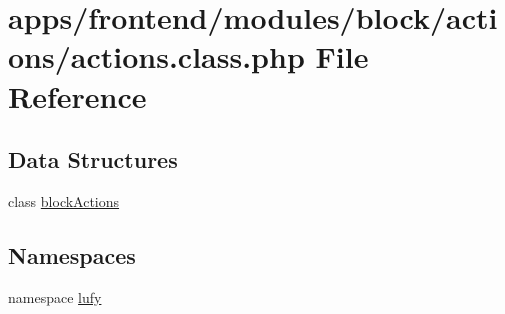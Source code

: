 \hypertarget{frontend_2modules_2block_2actions_2actions_8class_8php}{\section{apps/frontend/modules/block/actions/actions.class.\-php File Reference}
\label{frontend_2modules_2block_2actions_2actions_8class_8php}
}
\subsection*{Data Structures}
\begin{DoxyCompactItemize}
\item 
class \hyperlink{classblock_actions}{block\-Actions}
\end{DoxyCompactItemize}
\subsection*{Namespaces}
\begin{DoxyCompactItemize}
\item 
namespace \hyperlink{namespacelufy}{lufy}
\end{DoxyCompactItemize}
